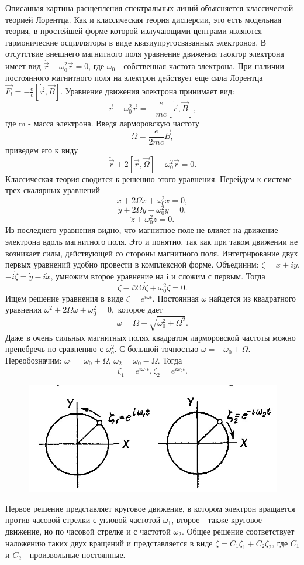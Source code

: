  Описанная картина расщепления спектральных линий объясняется классической теорией Лорентца. Как и классическая теория дисперсии, это есть модельная теория, в простейшей форме которой излучающими центрами являются гармонические осцилляторы в виде квазиупругосвязанных электронов. В отсутствие внешнего магнитного поля уравнение движения таокгор электрона имеет вид $\ddot{\vec{r}}-\omega_0^2 \vec{r}=0$, где $\omega_0$ - собственная частота электрона. При наличии постоянного магнитного поля на электрон действует еще сила Лорентца $\vec{F_l}=-\frac ec[\dot{\vec{r}}, \vec{B}]$. Уравнение движения электрона принимает вид: $$\ddot{\vec{r}}-\omega_0^2 \vec{r}=-\frac{e}{mc}[\dot{\vec{r}}, \vec{B}],$$ где m - масса электрона. Введя ларморовскую частоту $$\Omega=\frac{e}{2mc}\vec{B},$$ приведем его к виду $$\ddot{\vec{r}}+2[\dot{\vec{r}},\vec{\Omega}]+\omega_0^2\vec{r}=0.$$
 Классическая теория сводится к решению этого уравнения. Перейдем к системе трех скалярных уравнений $$\ddot{x}+2\Omega \dot{x}+\omega_0^2x=0,$$ $$\ddot{y}+2\Omega \dot{y}+\omega_0^2y=0,$$ $$\ddot{z}+\omega_0^2z=0.$$
Из последнего уравнения видно, что магнитное поле не влияет на движение электрона вдоль магнитного поля. Это и понятно, так как при таком движении не возникает силы, действующей со стороны магнитного поля. Интегрирование двух первых уравнений удобно провести в комплексной форме. Объединим: $\zeta=x+iy$, $-i\dot{\zeta}=\dot{y}-i\dot{x}$, умножим второе уравнение на i и сложим с первым. Тогда $$\ddot{\zeta}-i2\Omega\dot{\zeta}+\omega_0^2\zeta=0.$$Ищем решение уравнения  в виде $\zeta=e^{i\omega t}$. Постоянная $\omega$ найдется из квадратного уравнения $\omega^2+2\Omega \omega+\omega_0^2=0,$ которое дает $$\omega=\Omega \pm \sqrt{\omega_0^2+\Omega^2}.$$ Даже в очень сильных магнитных полях квадратом ларморовской частоты можно пренебречь по сравнению с $\omega_o^2$. С большой точностью $\omega=\pm \omega_0+\Omega$. Переобозначим: $\omega_1=\omega_0+\Omega$, $\omega_2=\omega_0-\Omega$. Тогда $$\zeta_1=e^{i\omega_1 t}, \zeta_2=e^{i\omega_2 t}.$$

\begin{figure}[h]
	\centering
	\includegraphics[width=0.4\linewidth]{fig/fig11}
\end{figure}

Первое решение представляет круговое движение, в котором электрон вращается против часовой стрелки с угловой частотой $\omega_1$, второе - также круговое движение, но по часовой стрелке и с частотой $\omega_2$. Общее решение соответствует наложению таких двух вращений и представляется в виде $\zeta=C_1\zeta_1+C_2\zeta_2$, где $C_1$ и $C_2$ - произвольные постоянные.

